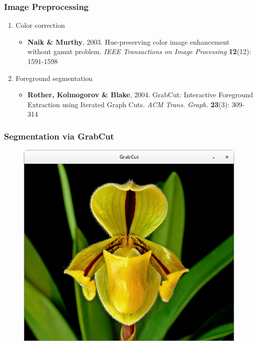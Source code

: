 \documentclass[]{beamer}
\begin{document}
    \begin{frame}
        \frametitle{Image Preprocessing}

        \begin{enumerate}
            \item Color correction
                \begin{itemize}
                    \item \textbf{Naik \& Murthy}, 2003. Hue-preserving color image
                    enhancement without gamut problem. \textit{IEEE Transactions on
                    Image Processing} \textbf{12}(12): 1591-1598
                \end{itemize}
            \item Foreground segmentation
                \begin{itemize}
                    \item \textbf{Rother, Kolmogorov \& Blake}, 2004. GrabCut: Interactive
                    Foreground Extraction using Iterated Graph Cuts.
                    \textit{ACM Trans. Graph.} \textbf{23}(3): 309-314
                \end{itemize}
        \end{enumerate}
    \end{frame}

    \begin{frame}[plain]
        \frametitle{Segmentation via GrabCut}

        \begin{figure}[h]
        \centering
        \includegraphics[width=.60\textwidth]{GrabCut_druryi_1}
        \end{figure}
    \end{frame}
\end{document}
